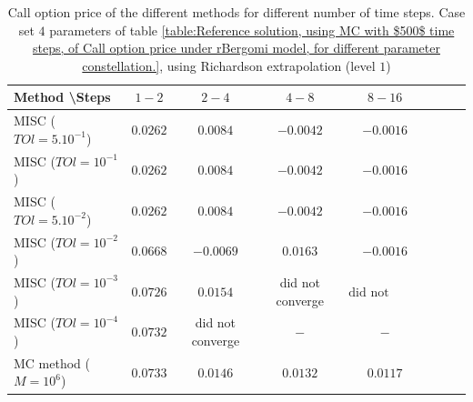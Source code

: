 \documentclass[11pt]{article}
\begin{document}
\begin{table}[h!]
	\centering
	\begin{tabular}{l*{6}{c}r}
		Method \textbackslash  Steps    &$1-2$         & $2-4$ & $4-8$ & $8-16$\\
		\hline
		MISC ($TOl=5.10^{-1}$)& $0.0262$  & $0.0084$ & $-0.0042$ & $-0.0016$ \\
		MISC ($TOl=10^{-1}$)  &$0.0262$  & $0.0084$ & $-0.0042$ & $-0.0016$  \\
		MISC ($TOl=5.10^{-2}$)  &$0.0262$  & $0.0084$ & $-0.0042$ & $-0.0016$  \\
		MISC ($TOl=10^{-2}$)  & $0.0668$  & $-0.0069$ & $0.0163$ & $-0.0016$  \\
		MISC ($TOl=10^{-3}$)  & $0.0726$ & $0.0154$ & did not converge & $\text{did not converge}$ \\
		MISC ($TOl=10^{-4}$)  & $0.0732$ &did not converge & $-$ & $-$  \\
		\hline
		MC method ($M=10^6$)  &$0.0733$ & $0.0146$ & $0.0132$ & $0.0117$ \\
		\hline
	\end{tabular}
	\caption{Call option price of the different methods for different number of time steps. Case set $4$ parameters of table \ref{table:Reference solution, using MC with $500$ time steps, of Call option price under rBergomi model, for different parameter constellation.}, using Richardson extrapolation (level $1$)}
	\label{table:  Call option price of the different methods for different number of time steps. Case set $4$ parameter, using Richardson extrapolation (level $1$)}
\end{table}
\end{document}
